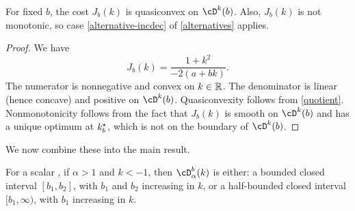 \begin{lemma}
\label{lem:cost-quasi}
	For fixed $b$, the cost $J_b(k)$ is quasiconvex on $\kdomain(b)$.
	Also, $J_b(k)$ is not monotonic,
	so case \ref{alternative-incdec} of \ref{alternatives} applies.
\end{lemma}
\begin{proof}
	We have
	\[
		J_b(k)
		=
		\frac{
			1 + k^2
		}{
			-2(a + bk)
		}.
	\]
	The numerator is nonnegative and convex on $k \in \mathbb{R}$.
	The denominator is linear (hence concave) and positive on $\kdomain(b)$.
	Quasiconvexity follows from \ref{quotient}.
	Nonmonotonicity follows from the fact that $J_b(k)$ is smooth on $\kdomain(b)$
	and has a unique optimum at $k^\star_{b}$, which is not on the boundary of $\kdomain(b)$.
\end{proof}

\noindent We now combine these into the main result.

\begin{lemma}
\label{lem:increasing-main}
	For a scalar \DDFproblem,
	if $\alpha > 1$ and $k < -1$,
	then $\bdomain_\alpha(k)$ is either:
	a bounded closed interval $[b_1, b_2]$,
		with $b_1$ and $b_2$ increasing in $k$, or
	a half-bounded closed interval $[b_1, \infty)$,
		with $b_1$ increasing in $k$.
\end{lemma}

